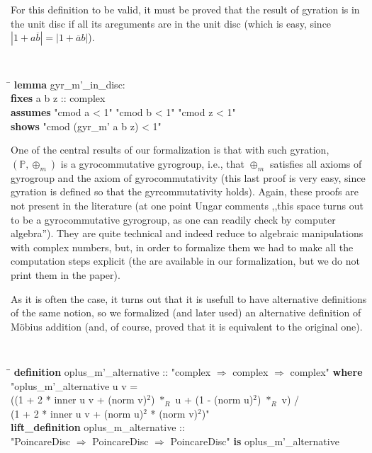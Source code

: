\documentclass[a4paper]{article}
\theoremstyle{definition}
\begin{document}
For this definition to be valid, it must be proved that the result of
gyration is in the unit disc if all its areguments are in the unit
disc (which is easy, since $|1+a\overline{b}| = |1+\overline{a}b|$).

{\tt
\begin{small}
\begin{tabbing}
\hspace{5mm}\=\kill
{\bf lemma} gyr\_m'\_in\_disc:\\
\>  {\bf fixes} a b z :: complex\\
\>  {\bf assumes} "cmod a < 1" "cmod b < 1" "cmod z < 1"\\
\>  {\bf shows} "cmod (gyr\_m' a b z) < 1"
\end{tabbing}
\end{small}
}

One of the central results of our formalization is that with such
gyration, $(\mathbb{P}, \oplus_m)$ is a gyrocommutative gyrogroup,
i.e., that $\oplus_m$ satisfies all axioms of gyrogroup and the axiom
of gyrocommutativity (this last proof is very easy, since gyration is
defined so that the gyrcommutativity holds). Again, these proofs are
not present in the literature (at one point Ungar comments ,,this
space turns out to be a gyrocommutative gyrogroup, as one can readily
check by computer algebra''). They are quite technical and indeed
reduce to algebraic manipulations with complex numbers, but, in order
to formalize them we had to make all the computation steps explicit
(the are available in our formalization, but we do not print them in
the paper).

As it is often the case, it turns out that it is usefull to have
alternative definitions of the same notion, so we formalized (and
later used) an alternative definition of M\"obius addition (and, of
course, proved that it is equivalent to the original one).

{\tt
\begin{small}
\begin{tabbing}
\hspace{5mm}\=\hspace{5mm}\=\kill
{\bf definition} oplus\_m'\_alternative :: "complex $\Rightarrow$ complex $\Rightarrow$ complex" {\bf where} \\
\>  "oplus\_m'\_alternative u v =\\
\>\>      ((1 + 2 * inner u v + (norm v)$^2$) $*_R$ u + (1 - (norm u)$^2$) $*_R$ v) / \\
\>\>       (1 + 2 * inner u v + (norm u)$^2$ * (norm v)$^2$)"\\
{\bf lift\_definition} oplus\_m\_alternative ::\\
\> "PoincareDisc $\Rightarrow$ PoincareDisc $\Rightarrow$ PoincareDisc" {\bf is} oplus\_m'\_alternative
\end{tabbing}
\end{small}
}
\end{document}
